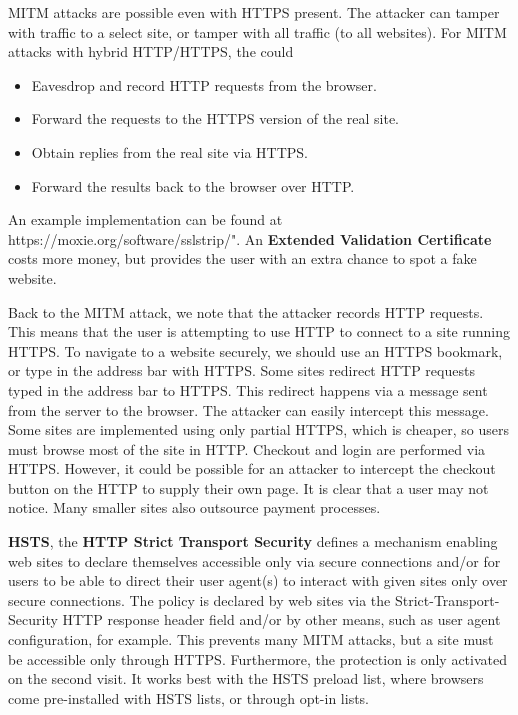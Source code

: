 \documentclass[11pt]{article}
\theoremstyle{plain} %
\theoremstyle{definition}
\theoremstyle{example}
\theoremstyle{remark}
\def\url#1{\expandafter\string\csname #1\endcsname}
\begin{document}
MITM attacks are possible even with HTTPS present. The attacker can tamper with traffic to a select site, or tamper with all traffic (to all websites). For MITM attacks with hybrid HTTP/HTTPS, the could 
\begin{itemize}
\item Eavesdrop and record HTTP requests from the browser.
	\item Forward the requests to the HTTPS version of the real site.
	\item Obtain replies from the real site via HTTPS.
	\item Forward the results back to the browser over HTTP. 
\end{itemize}
An example implementation can be found at \url{https://moxie.org/software/sslstrip/}". An \textbf{Extended Validation Certificate} costs more money, but provides the user with an extra chance to spot a fake website. 

Back to the MITM attack, we note that the attacker records HTTP requests. This means that the user is attempting to use HTTP to connect to a site running HTTPS. To navigate to a website securely, we should use an HTTPS bookmark, or type in the address bar with HTTPS. Some sites redirect HTTP requests typed in the address bar to HTTPS. This redirect happens via a message sent from the server to the browser. The attacker can easily intercept this message. Some sites are implemented using only partial HTTPS, which is cheaper, so
users must browse most of the site in HTTP. Checkout and login are performed via HTTPS. However, it could be possible for an attacker to intercept the checkout button on the HTTP to supply their own page. It is clear that a user may not notice. Many smaller sites also outsource payment processes. 

\textbf{HSTS}, the \textbf{HTTP Strict Transport Security} defines a mechanism enabling web sites to declare themselves accessible only via secure connections and/or for users to be able to direct their user agent(s) to interact with given sites only over secure connections. The policy is declared by web sites via the Strict-Transport-Security HTTP response header field and/or by other means, such as user agent configuration, for example. This prevents many MITM attacks, but a site must be accessible only through HTTPS. Furthermore, the protection is only activated on the second visit. It works best with the HSTS preload list, where browsers come pre-installed with HSTS lists, or through opt-in lists. 
\end{document}
